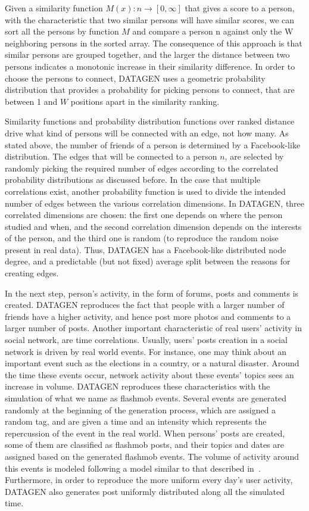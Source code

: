 Given a similarity function $M(x) : n → [0, \infty]$ that gives a score to a person,
with the characteristic that two similar persons will have similar scores, we
can sort all the persons by function $M$ and compare a person n against only the
W neighboring persons in the sorted array. The consequence of this approach is
that similar persons are grouped together, and the larger the
distance between two persons indicates a monotonic increase in their similarity
difference. In order to choose the persons to connect, DATAGEN uses a geometric
probability distribution that provides a probability for picking persons to
connect, that are between 1 and $W$ positions apart in the similarity
ranking.

Similarity functions and probability distribution functions over ranked
distance drive what kind of persons will be connected with an edge, not how
many. As stated above, the number of friends of a person is determined by a
Facebook-like distribution. The edges that will be connected to a person $n$,
are selected by randomly picking the required number of edges according to the
correlated probability distributions as discussed before. In the case that
multiple correlations exist, another probability function is used to divide the
intended number of edges between the various correlation dimensions. In DATAGEN,
three correlated dimensions are chosen: the first one depends on where the
person studied and when, and the second correlation dimension depends on the
interests of the person, and the third one is random (to reproduce the random
noise present in real data). Thus, DATAGEN has a Facebook-like distributed node
degree, and a predictable (but not fixed) average split between the reasons for
creating edges.

In the next step, person's activity, in the form of forums, posts and comments
is created. DATAGEN reproduces the fact that people with a larger number of
friends have a higher activity, and hence post more photos and comments to a
larger number of posts. Another important characteristic of real users'
activity in social network, are time correlations.  Usually, users' posts
creation in a social network is driven by real world events.  For
instance, one may think about an important event such as the elections in a
country, or a natural disaster. Around the time these events occur, network
activity about these events' topics sees an increase in volume. DATAGEN
reproduces these characteristics with the simulation of what we name as
flashmob events.  Several events are generated randomly at the beginning of the
generation process, which are assigned a random tag, and are given a time and
an intensity which represents the repercussion of the event in the real world.
When persons' posts are created, some of them are classified as flashmob posts,
and their topics and dates are assigned based on the generated flashmob events.
The volume of activity around this events is modeled following a model similar
to that described in~\cite{flashmobs}. Furthermore, in order to reproduce the
more uniform every day's user activity, DATAGEN also generates post uniformly
distributed along all the simulated time.

